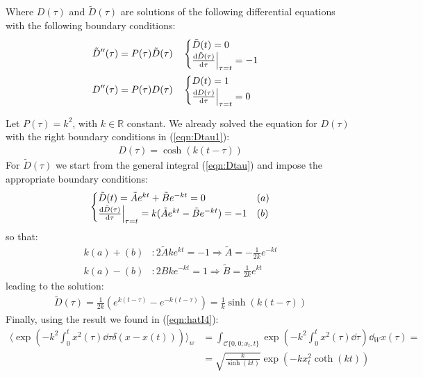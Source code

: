 \documentclass[../template.tex]{subfiles}
\begin{document}
Where $D(\tau)$ and $\tilde{D}(\tau)$ are solutions of the following differential equations with the following boundary conditions:
\begin{align*}
    \tilde{D}''(\tau) &= P(\tau) \tilde{D}(\tau)
    && \begin{cases}
        \tilde{D}(t) = 0\\
        \dv{\tilde{D}(\tau)}{\tau}\Big|_{\tau = t} = -1
    \end{cases}\\
    D''(\tau) &= P(\tau) D(\tau) &&
    \begin{cases}
        D(t) = 1\\
        \dv{D(\tau)}{\tau}\Big|_{\tau=t} = 0
    \end{cases}
\end{align*}

\begin{example}[$P(\tau) = k^2$ with fixed end-point]
    Let $P(\tau) = k^2$, with $k \in \mathbb{R}$ constant. We already solved the equation for $D(\tau)$ with the right boundary conditions in (\ref{eqn:Dtau1}):
    \begin{align*}
        D(\tau) = \cosh(k(t-\tau))
    \end{align*}    
    For $\tilde{D}(\tau)$ we start from the general integral (\ref{eqn:Dtau}) and impose the appropriate boundary conditions:
    \begin{align*}
        \begin{cases}
            \tilde{D}(t) = \tilde{A} e^{kt} + \tilde{B}e^{-kt} = 0 & (a)\\
            \dv{\tilde{D}(\tau)}{\tau}\Big|_{\tau= t} = k(\tilde{A} e^{kt}-\tilde{B}e^{-kt}) = -1 & (b)
        \end{cases}
    \end{align*} 
    so that:
    \begin{align*}
        k(a) + (b) &\colon 2 \tilde{A} k e^{kt} = -1 \Rightarrow \tilde{A} = -\frac{1}{2k} e^{-kt}\\
        k(a) - (b) &\colon 2 B ke^{-kt} = 1 \Rightarrow \tilde{B} = \frac{1}{2k} e^{kt} 
    \end{align*}
    leading to the solution:
    \begin{align*}
        \tilde{D}(\tau) = \frac{1}{2k}(e^{k(t-\tau)} - e^{-k(t-\tau)}) = \frac{1}{k} \sinh(k(t-\tau))  
    \end{align*}
    Finally, using the result we found in (\ref{eqn:hatI4}):
    \begin{align*}
        \langle \exp\left(-k^2 \int_0^t x^2(\tau) \dd{\tau} \delta(x - x(t))\right) \rangle_w &= \int_{\mathcal{C}\{0,0;x_t,t\}} \exp\left(-k^2 \int_0^t x^2(\tau) \dd{\tau}\right) \dd{_Wx(\tau)} =\\
        &= \sqrt{\frac{k}{\sinh(kt)} } \exp(-k x_t^2 \coth(kt))
    \end{align*}


    



\end{example}
\end{document}

